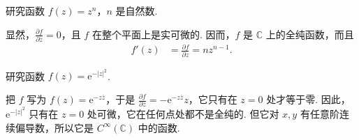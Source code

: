 \documentclass[../../main.tex]{subfiles}%
\begin{document}
\begin{example}
研究函数 $f(z) = z^n$，$n$ 是自然数.
\end{example}
\begin{solution}
显然，$\frac{\partial f}{\partial \overline{z}} = 0$，且 $f$ 在整个平面上是实可微的. 因而，$f$ 是 $\mathbb{C}$ 上的全纯函数，而且
\begin{align}
f'(z) &= \frac{\partial f}{\partial z} = nz^{n - 1}. \label{eq:2.2.5}
\end{align}

\end{solution}

\begin{example}
研究函数 $f(z) = \mathrm{e}^{-\vert z \vert^2}$.
\end{example}
\begin{solution}
把 $f$ 写为 $f(z) = \mathrm{e}^{-z\overline{z}}$，于是 $\frac{\partial f}{\partial \overline{z}} = -\mathrm{e}^{-z\overline{z}}z$，它只有在 $z = 0$ 处才等于零. 因此，$\mathrm{e}^{-\vert z \vert^2}$ 只有在 $z = 0$ 处可微，它在任何点处都不是全纯的. 但它对 $x, y$ 有任意阶连续偏导数，所以它是 $C^\infty(\mathbb{C})$ 中的函数.

\end{solution}
\end{document}
